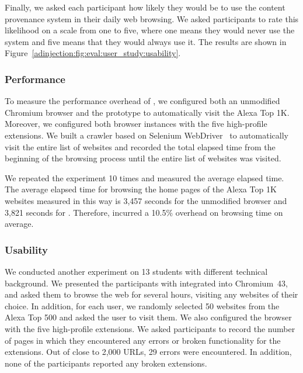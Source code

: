 Finally, we asked each participant how likely they would be to use the content
provenance system in their daily web browsing. We asked participants to rate
this likelihood on a scale from one to five, where one means they would never
use the system and five means that they would always use it. The results are
shown in Figure~\ref{adinjection:fig:eval:user_study:usability}.

\subsubsection{Performance}
\label{adinjection:sec:analysis:perf}

To measure the performance overhead of \origintracer, we configured both an
unmodified Chromium browser and the prototype to automatically visit the Alexa
Top 1K. Moreover, we configured both browser instances with the five
high-profile extensions. We built a crawler based on Selenium
WebDriver~\cite{selenium} to automatically visit the entire list of websites and
recorded the total elapsed time from the beginning of the browsing process until
the entire list of websites was visited.

We repeated the experiment 10 times and measured the average elapsed time. The
average elapsed time for browsing the home pages of the Alexa Top 1K websites
measured in this way is 3,457 seconds for the unmodified browser and 3,821
seconds for \origintracer. Therefore, \origintracer incurred a 10.5\% overhead
on browsing time on average.

\subsubsection{Usability}
\label{adinjection:sec:analysis:usability}

We conducted another experiment on 13 students with different technical
background. We presented the participants with \origintracer integrated into
Chromium~43, and asked them to browse the web for several hours, visiting any
websites of their choice. In addition, for each user, we randomly selected 50
websites from the Alexa Top 500 and asked the user to visit them. We also
configured the browser with the five high-profile extensions. We asked
participants to record the number of pages in which they encountered any errors
or broken functionality for the extensions. Out of close to 2,000 URLs, 29
errors were encountered. In addition, none of the participants reported any
broken extensions.
